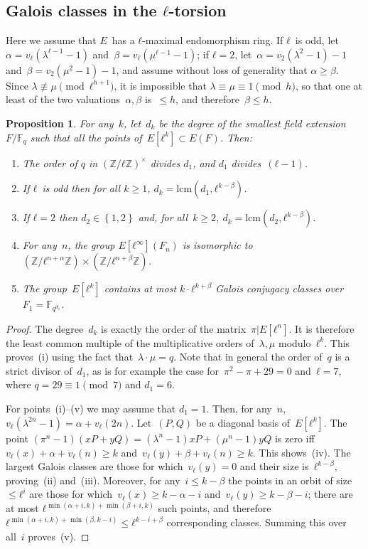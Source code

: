 \documentclass{lms}
\newtheorem{prop}[thm]{Proposition}
\def\acco#1{\left\{#1\right\}}
\newcommand{\F}{\mathbb{F}}
\begin{document}
\subsection{Galois classes in the $ℓ$-torsion}
Here we assume that $E$~has a $ℓ$-maximal endomorphism ring.
If $ℓ$~is odd, let~$α = v_ℓ(λ^{ℓ-1}-1)$ and~$β=v_ℓ(μ^{ℓ-1}-1)$;
if $ℓ=2$, let~$α=v_2(λ^2-1)-1$ and~$β = v_2(μ^2-1)-1$,
and assume without loss of generality that $α ≥ β$.
Since $λ ≢ μ \pmod{ℓ^{h+1}}$, it is impossible that $λ ≡ μ ≡ 1 \pmod{h}$,
so that one at least of the two valuations~$α, β$ is~$≤ h$,
and therefore~$β ≤ h$.
\label{sub:classes}
\begin{prop}\label{prop:classes}
For any~$k$, let~$d_k$ be the degree of the smallest field extension $F/\F_q$
such that all the points of~$E[ℓ^k]⊂E(F)$. Then:
\begin{enumerate}
\item The order of $q$ in $(ℤ/ℓℤ)^×$ divides $d_1$,
and $d_1$ divides~$(ℓ-1)$.
\item If $ℓ$~is odd then for all $k ≥ 1$,
$d_k = \mathrm {lcm} (d_1, ℓ^{k-β})$.
\item If $ℓ=2$ then $d_2 ∈ \acco{1,2}$ and, for all~$k ≥ 2$,
$d_k = \mathrm{lcm}(d_2, ℓ^{k-β})$.
\item For any~$n$, the group $E[ℓ^{∞}](F_n)$
is isomorphic to~$(ℤ/ℓ^{n+α} ℤ) × (ℤ/ℓ^{n+β} ℤ)$.
\item The group~$E[ℓ^k]$ contains at most
$k · ℓ^{k+β}$ Galois conjugacy classes over~$F_1 = \F_{q^{d_1}}$.
\end{enumerate}
\end{prop}
\begin{proof}
The degree~$d_k$ is exactly the order of the matrix~$π|E[ℓ^n]$.
It is therefore the least common multiple of the multiplicative orders
of~$λ, μ$ modulo~$ℓ^k$.
This proves~(i) using the fact that~$λ · μ = q$.
Note that in general the order of~$q$ is a strict divisor of~$d_1$,
as is for example the case for~$π^2 - π + 29 = 0$ and~$ℓ = 7$,
where $q = 29 ≡ 1 \pmod{7}$ and $d_1 = 6$.

For points~(i)--(v) we may assume that $d_1 = 1$.
Then, for any~$n$, $v_ℓ(λ^{2n}-1) = α + v_{ℓ} (2n)$.
Let~$(P, Q)$ be a diagonal basis of~$E[ℓ^k]$.
The point $(π^n - 1) (x P + y Q) = (λ^n-1) x P + (μ^n-1) y Q$
is zero iff $v_{ℓ} (x) + α + v_{ℓ} (n) ≥ k$
and~$v_{ℓ} (y) + β + v_{ℓ} (n) ≥ k$. This shows~(iv).
The largest Galois classes
are those for which~$v_{ℓ} (y) = 0$ and their size is~$ℓ^{k - β}$,
proving~(ii) and~(iii).
Moreover, for any~$i ≤ k-β$ the points in an orbit of size~$≤ ℓ^i$
are those for which~$v_{ℓ} (x) ≥ k - α - i$ and~$v_{ℓ} (y) ≥ k - β - i$;
there are at most $ℓ^{\min(α+i, k) + \min (β+i, k)}$ such points,
and therefore $ℓ^{\min(α+i, k) + \min(β, k-i)} ≤ ℓ^{k-i+β}$
corresponding classes.
Summing this over all~$i$ proves~(v).
\end{proof}
\end{document}

